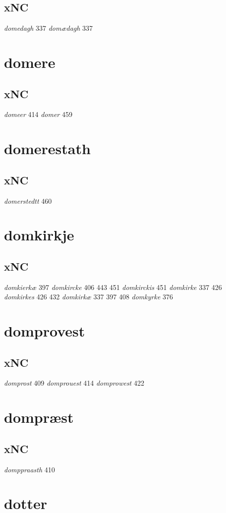 \documentclass[a4paper,twocolumn]{article}
\begin{document}
\subsection{xNC}
\label{sec:org7ca11d4}
\emph{domedagh} 337 \emph{domædagh} 337 
\section{domere}
\label{sec:orgba59f53}
\subsection{xNC}
\label{sec:org1ceba56}
\emph{domeer} 414 \emph{domer} 459 
\section{domerestath}
\label{sec:orgf59dc20}
\subsection{xNC}
\label{sec:orga1f1173}
\emph{domerstedtt} 460 
\section{domkirkje}
\label{sec:org22654b5}
\subsection{xNC}
\label{sec:orga72397f}
\emph{domkierkæ} 397 \emph{domkircke} 406 443 451 \emph{domkirckis} 451 \emph{domkirke} 337 426 \emph{domkirkes} 426 432 \emph{domkirkæ} 337 397 408 \emph{domkyrke} 376 
\section{domprovest}
\label{sec:org3885f08}
\subsection{xNC}
\label{sec:org9eb1b61}
\emph{domprost} 409 \emph{domprouest} 414 \emph{domprowest} 422 
\section{dompræst}
\label{sec:orgf1860c5}
\subsection{xNC}
\label{sec:org0afe822}
\emph{domppraasth} 410 
\section{dotter}
\label{sec:org149f687}
\end{document}
